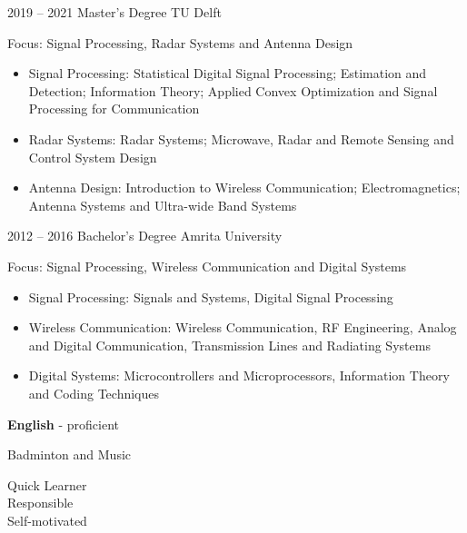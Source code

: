 \documentclass[9pt]{developercv} %
\begin{document}


\begin{entrylist}
	\entry
		{2019 -- 2021}
		{Master's Degree}
		{TU Delft}
		{Focus: Signal Processing, Radar Systems and Antenna Design \begin{itemize}
			\itemsep-0.25em
			\item Signal Processing: Statistical Digital Signal Processing; Estimation and Detection; Information Theory; Applied Convex Optimization and Signal Processing for Communication
			\item Radar Systems: Radar Systems; Microwave, Radar and Remote Sensing and Control System Design
			\item Antenna Design: Introduction to Wireless Communication; Electromagnetics; Antenna Systems and Ultra-wide Band Systems
		\end{itemize}}
	\entry
		{2012 -- 2016}
		{Bachelor's Degree}
		{Amrita University}
		{Focus: Signal Processing, Wireless Communication and Digital Systems\begin{itemize}
			\itemsep-0.25em
			\item Signal Processing: Signals and Systems, Digital Signal Processing
			\item Wireless Communication: Wireless Communication, RF Engineering, Analog and Digital Communication, Transmission Lines and Radiating Systems
			\item Digital Systems: Microcontrollers and Microprocessors, Information Theory and Coding Techniques
		\end{itemize}}
\end{entrylist}


\begin{minipage}[t]{0.3\textwidth}
	\vspace{-\baselineskip}
	\textbf{English} - proficient
\end{minipage}
\hfill
\begin{minipage}[t]{0.3\textwidth}
	\vspace{-\baselineskip}
	Badminton and Music
\end{minipage}
\hfill
\begin{minipage}[t]{0.3\textwidth}
	\vspace{-\baselineskip}
	Quick Learner \\ Responsible \\ Self-motivated
\end{minipage}
\end{document}
